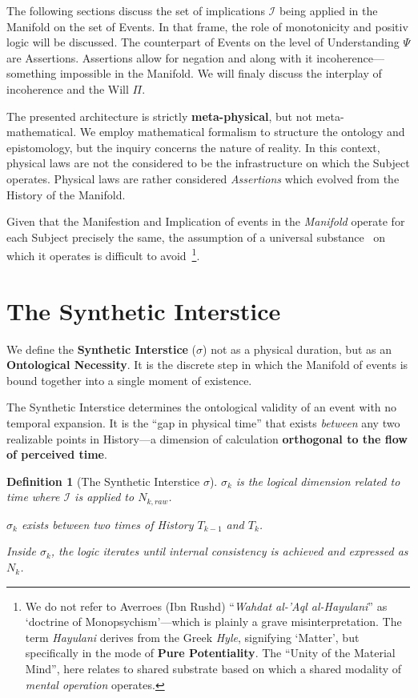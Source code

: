 \documentclass[11pt, a4paper]{article}
\theoremstyle{formalism}
\newtheorem{formalism}{Definition}
\begin{document}
{The following sections discuss the set of implications $\mathcal{I}$ being
applied in the Manifold on the set of Events. In that frame, the role of
monotonicity and positiv logic will be discussed. The counterpart of Events on
the level of Understanding $\Psi$ are Assertions. Assertions allow for negation
and along with it incoherence---something impossible in the Manifold.
We will finaly discuss the interplay of incoherence and the Will $\Pi$.

The presented architecture is strictly \textbf{meta-physical}, but not
meta-mathematical. We employ mathematical formalism to structure the ontology
and epistomology, but the inquiry concerns the nature of reality. In this
context, physical laws are not the considered to be the infrastructure on which
the Subject operates. Physical laws are rather considered \textit{Assertions}
which evolved from the History of the Manifold.

Given that the Manifestion and Implication of events in the {\it Manifold\/}
operate for each Subject precisely the same, the assumption of a universal
substance~\cite{AverroesDeAnima} on which it operates is difficult to 
avoid~\footnote{We do not refer to Averroes (Ibn Rushd) ``\textit{Wahdat al-'Aql al-Hayulani}'' as `doctrine 
of Monopsychism'---which is plainly a grave misinterpretation.
The term \textit{Hayulani} derives from the Greek \textit{Hyle}, signifying `Matter', 
but specifically in the mode of \textbf{Pure Potentiality}. The ``Unity of the Material Mind'', here
relates to shared substrate based on which a shared modality of \textit{mental operation} operates.}.

\section{The Synthetic Interstice}

We define the \textbf{Synthetic Interstice} ($\sigma$) not as a physical
duration, but as an \textbf{Ontological Necessity}. It is the discrete
step in which the Manifold of events is bound together into a single moment of
existence. 

The Synthetic Interstice determines the ontological validity of an event with 
no temporal expansion. It is the ``gap in physical time'' that exists \textit{between} 
any two realizable points in History---a dimension of calculation 
\textbf{orthogonal to the flow of perceived time}.

\begin{formalism}[The Synthetic Interstice $\sigma$]
\item $\sigma_k$ is the logical dimension related to time where $\mathcal{I}$ is applied to $N_{k, raw}$.
\item $\sigma_k$ exists between two times of History $T_{k-1}$ and $T_k$.
\item Inside $\sigma_k$, the logic iterates until internal consistency is achieved and expressed as $N_k$.
\end{formalism}

}
\end{document}
